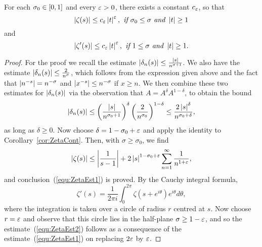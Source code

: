 \begin{proposition}
	For each $\sigma_0 \in \left[0 , 1\right]$ and every $\varepsilon > 0$, there exists a constant $c_\varepsilon$, so that
\begin{equation}\label{equ:ZetaEst1}
	\left|\zeta(s)\right| \leq c_\varepsilon \left|t\right|^\varepsilon, \textit{ if } \sigma_0 \leq \sigma \textit{ and } \left|t\right| \geq 1
\end{equation}
	and
\begin{equation}\label{equ:ZetaEst2}
	\left|\zeta'(s)\right| \leq c_\varepsilon \left|t\right|^\varepsilon, \textit{ if } 1 \leq \sigma \textit{ and } \left|t\right| \geq 1.
\end{equation}
\end{proposition}
\begin{proof}
	For the proof we recall the estimate $\left|\delta_n(s)\right| \leq \frac{\left|s\right|}{n^{\sigma + 1}}$. We also have the estimate $\left|\delta_n(s)\right| \leq \frac{2}{n^\sigma}$, which follows from the expression given above and the fact that $\left|n^{-s}\right| = n^{-\sigma}$ and $\left|x^{-s}\right| \leq n^{-\sigma}$ if $x \geq n$. We then combine these two estimates for $\left|\delta_n(s)\right|$ via the observation that $A = A^\delta A^{1 - \delta}$, to obtain the bound
\begin{equation*}
	\left|\delta_n(s)\right| \leq \left(\frac{\left|s\right|}{n^{\sigma_0 + 1}}\right)^\delta \left(\frac{2}{n^{\sigma_0}}\right)^{1 - \delta} \leq \frac{2 \left|s\right|^\delta}{n^{\sigma_0 + \delta}},
\end{equation*}
	as long as $\delta \geq 0$. Now choose $\delta = 1 - \sigma_0 + \varepsilon$ and apply the identity to Corollary~\ref{cor:ZetaCont}. Then, with $\sigma \geq \sigma_0$, we find
\begin{equation*}
	\left|\zeta(s)\right| \leq \left|\frac{1}{s - 1}\right| + 2 \left|s\right|^{1 - \sigma_0 + \varepsilon} \sum _{n = 1} ^\infty \frac{1}{n^{1 + \varepsilon}},
\end{equation*}
	and conclusion~(\ref{equ:ZetaEst1}) is proved. By the Cauchy integral formula,
\begin{equation*}
	\zeta'(s) = \frac{1}{2 \pi i} \int _0 ^{2 \pi} \zeta(s + e^{i \theta}) e^{i \theta} d\theta,
\end{equation*}
	where the integration is taken over a circle of radius $r$ centred at $s$. Now choose $r = \varepsilon$ and observe that this circle lies in the half-plane $\sigma \geq 1 - \varepsilon$, and so the estimate~(\ref{equ:ZetaEst2}) follows as a consequence of the estimate~(\ref{equ:ZetaEst1}) on replacing $2 \varepsilon$ by $\varepsilon$.
\end{proof}


